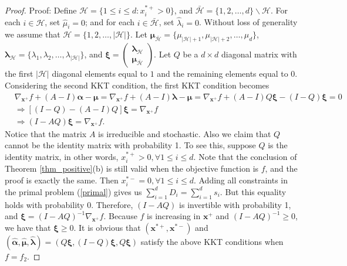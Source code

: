 \documentclass[final,11pt,3p]{article}\usepackage{setspace}
\begin{document}
\begin{proof}{Proof:}
	Define $\mathcal{H} = \{1 \le i \le d: x_i^{*+}>0\} $, and $\bar{\mathcal{H}} = \{1,2,\dots,d\} \backslash \mathcal{H}$. For each $i \in \mathcal{H}$, set $\hat{\mu}_i = 0$; and for each $i \in \bar{\mathcal{H}} $, set $\hat{\lambda}_i = 0$. Without loss of generality we assume that $\mathcal{H}=\{1,2,\dots,|\mathcal{H}| \}$. Let $\boldsymbol{\mu}_{\bar{\mathcal{H}}} = \{{\mu}_{|\mathcal{H}|+1}, {\mu}_{|\mathcal{H}|+2}, \dots, {\mu}_d\}$, $\boldsymbol{\lambda}_{\mathcal{H}} = \{\lambda_1, \lambda_2, \dots, \lambda_{|\mathcal{H}|}\}$, and $\boldsymbol{\xi} = \begin{pmatrix}\boldsymbol{\lambda}_{\mathcal{H}} \\ \boldsymbol{\mu}_{\bar{\mathcal{H}}} \end{pmatrix}$. Let $Q$ be a $d \times d$ diagonal matrix with the first $|\mathcal{H}|$ diagonal elements equal to $1$ and the remaining elements equal to 0. Considering the second KKT condition, the first KKT condition becomes
	\begin{align*}
		&\nabla_{\boldsymbol{x}^+}f + (A-I)\boldsymbol{\alpha} - \boldsymbol{\mu} = \nabla_{\boldsymbol{x}^+}f + (A-I)\boldsymbol{\lambda} - \boldsymbol{\mu} = \nabla_{\boldsymbol{x}^+}f + (A-I)Q\boldsymbol{\xi} - (I-Q)\boldsymbol{\xi} =0\\
		&\Rightarrow  [(I-Q)-(A-I)Q]\boldsymbol{\xi} = \nabla_{\boldsymbol{x}^+}f\\
		&\Rightarrow (I-AQ)\boldsymbol{\xi} = \nabla_{\boldsymbol{x}^+}f.
	\end{align*}
	Notice that the matrix $A$ is irreducible and stochastic. Also we claim that $Q$ cannot be the identity matrix with probability 1. To see this, suppose $Q$ is the identity matrix, in other words, $x_i^{*+} > 0, \forall 1 \le i \le d$. Note that the conclusion of Theorem \ref{thm_positive}(b) is still valid when the objective function is $f$, and the proof is exactly the same. Then $x_i^{*-} = 0, \forall 1 \le i \le d$. Adding all constraints in the primal problem (\ref{primal}) gives us $\sum_{i=1}^d D_i = \sum_{i=1}^d s_i$. But this equality holds with probability 0. Therefore, $(I-AQ)$ is invertible with probability 1,
	and $\boldsymbol{\xi} = (I-AQ)^{-1}\nabla_{\boldsymbol{x}^+}f$. Because $f$ is increasing in $\boldsymbol{x}^+$ and $(I - AQ)^{-1} \geq 0$, we have that $\boldsymbol{\xi} \ge 0$. It is obvious that $(\boldsymbol{x}^{*+}, \boldsymbol{x}^{*-})$ and $(\hat{\boldsymbol{\alpha}}, \hat{\boldsymbol{\mu}}, \hat{\boldsymbol{\lambda}}) = (Q\boldsymbol{\xi}, (I-Q)\boldsymbol{\xi}, Q\boldsymbol{\xi})$ satisfy the above KKT conditions when $f = f_2$. {}
\end{proof}
\end{document}
